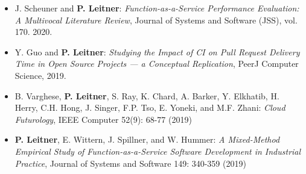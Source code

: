 \documentclass[paper=letter,fontsize=11pt]{scrartcl} %
\begin{document}
\begin{itemize}
	\item  J. Scheuner and \textbf{P. Leitner}: \emph{Function-as-a-Service Performance Evaluation: A Multivocal
 Literature Review}, Journal of Systems and Software (JSS), vol. 170. 2020.
	\item  Y. Guo and \textbf{P. Leitner}: \emph{Studying the Impact of CI on Pull Request Delivery Time in Open Source Projects — a Conceptual Replication}, PeerJ Computer Science, 2019.
	\item  B. Varghese, \textbf{P. Leitner}, S. Ray, K. Chard, A. Barker, Y. Elkhatib, H. Herry, C.H. Hong, J. Singer, F.P. Tso, E. Yoneki, and M.F. Zhani: \emph{Cloud Futurology}, IEEE Computer 52(9): 68-77 (2019)
	\item \textbf{P. Leitner}, E. Wittern, J. Spillner, and W. Hummer: \emph{A Mixed-Method Empirical Study of Function-as-a-Service Software Development in Industrial Practice}, Journal of Systems and Software 149: 340-359 (2019)
\end{itemize}
\end{document}
